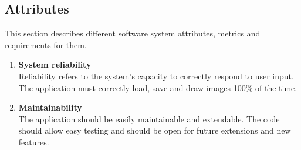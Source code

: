 \documentclass[12pt]{article}
\begin{document}
\subsection{Attributes}
This section describes different software system attributes, metrics and requirements for them.
\begin{enumerate}
\item \textbf{ System reliability}
\\
Reliability refers to the system's capacity to correctly respond to user input.
The application must correctly load, save and draw images 100\% of the time.
\item \textbf{Maintainability}
\\
The application should be easily maintainable and extendable.
The code should allow easy testing and should be open for future extensions and new features. 
\end{enumerate}
\end{document}
